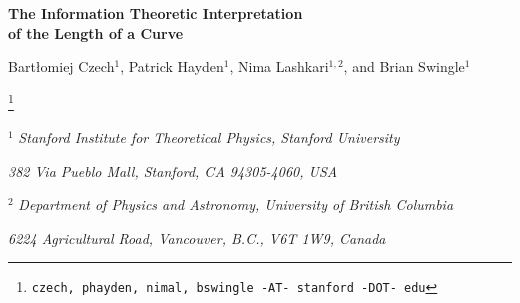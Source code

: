 \documentclass[12pt]{article}
\newcommand\blfootnote[1]{%
  \begingroup
  \renewcommand\thefootnote{}\footnote{\hspace{-6mm}#1}%
  \addtocounter{footnote}{-1}%
  \endgroup
}
\newcommand{\bbibitem}[1]{\bibitem{#1}\marginpar{#1}}
\def\Label#1{\label{#1}%
  \smash{\hbox to0pt{\raise1ex\hbox{\tiny[#1]}\hss}}}
\def\noLabels{\let\Label=\label}
\def\nobbibitem{\let\bbibitem=\bibitem}
\begin{document}
\noLabels %
\nobbibitem %


\clearpage\thispagestyle{empty}
\begin{center}
{\Large \bf  The Information Theoretic Interpretation \vspace{0.15cm} \\
of the Length of a Curve}


\vspace{7mm}

Bart{\l}omiej Czech$^1$, Patrick Hayden$^1$, Nima Lashkari$^{1,2}$, and Brian Swingle$^1$

\blfootnote{\tt czech, phayden, nimal, bswingle -AT- stanford -DOT- edu}%





\medskip\centerline{$^1$ \it Stanford Institute for Theoretical Physics, Stanford University}
\smallskip\centerline{\it 382 Via Pueblo Mall, Stanford, CA 94305-4060, USA}
\bigskip\centerline{$^2$ \it Department of Physics and Astronomy, University of British Columbia}
\smallskip\centerline{\it 6224 Agricultural Road,
Vancouver, B.C., V6T 1W9, Canada}
\end{center}

\vspace{5mm}
\end{document}
